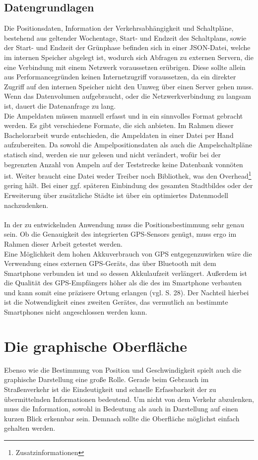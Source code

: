 \subsection{Datengrundlagen}
Die Positionsdaten, Information der Verkehrsabhängigkeit und Schaltpläne, bestehend aus geltender Wochentage, Start- und Endzeit des Schaltplans, sowie der Start- und Endzeit der Grünphase befinden sich in einer \gls{JSON}-Datei, welche im internen Speicher abgelegt ist, wodurch sich Abfragen zu externen Servern, die eine Verbindung mit einem Netzwerk voraussetzen erübrigen. Diese sollte allein aus Performancegründen keinen Internetzugriff voraussetzen, da ein direkter Zugriff auf den internen Speicher nicht den Umweg über einen Server gehen muss. Wenn das Datenvolumen aufgebraucht, oder die Netzwerkverbindung zu langsam ist, dauert die Datenanfrage zu lang.\\
Die Ampeldaten müssen manuell erfasst und in ein sinnvolles Format gebracht werden. Es gibt verschiedene Formate, die sich anbieten. Im Rahmen dieser Bachelorarbeit wurde entschieden, die Ampeldaten in einer Datei per Hand aufzubereiten. Da sowohl die Ampelpositionsdaten als auch die Ampelschaltpläne statisch sind, werden sie nur gelesen und nicht verändert, wofür bei der begrenzten Anzahl von Ampeln auf der Teststrecke keine Datenbank vonnöten ist. Weiter braucht eine Datei weder Treiber noch Bibliothek, was den Overhead\footnote{ Zusatzinformationen} gering hält. 
Bei einer ggf. späteren Einbindung des gesamten Stadtbildes oder der Erweiterung über zusätzliche Städte ist über ein optimiertes Datenmodell nachzudenken. \\\\
In der zu entwickelnden Anwendung muss die Positionsbestimmung sehr genau sein. Ob die Genauigkeit des integrierten \gls{GPS}-Sensors genügt, muss ergo im Rahmen dieser Arbeit getestet werden. \\
Eine Möglichkeit dem hohen Akkuverbrauch von \gls{GPS} entgegenzuwirken wäre die Verwendung eines externen \gls{GPS}-Geräts, das über Bluetooth mit dem \gls{Smartphone} verbunden ist und so dessen Akkulaufzeit verlängert. Außerdem ist die Qualität des \gls{GPS}-Empfängers höher als die des im \gls{Smartphone} verbauten und kann somit eine präzisere Ortung erlangen (vgl. \cite{gps} S. 28). Der Nachteil hierbei ist die Notwendigkeit eines zweiten Gerätes, das vermutlich an bestimmte Smartphones nicht angeschlossen werden kann. 
\section{Die graphische Oberfläche}
Ebenso wie die Bestimmung von Position und Geschwindigkeit spielt auch die graphische Darstellung eine große Rolle. Gerade beim Gebrauch im Straßenverkehr ist die Eindeutigkeit und schnelle Erfassbarkeit der zu übermittelnden Informationen bedeutend. Um nicht von dem Verkehr abzulenken, muss die Information, sowohl in Bedeutung als auch in Darstellung auf einen kurzen Blick erkennbar sein. Demnach sollte die Oberfläche möglichst einfach gehalten werden.
